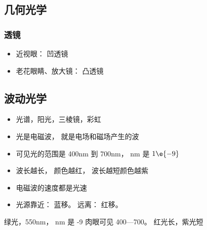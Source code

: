 
\begin{issues}
\issueDraft
\end{issues}

\subsection{几何光学}
\subsubsection{透镜}
\begin{itemize}
\item 近视眼： 凹透镜
\item 老花眼睛、放大镜： 凸透镜
\end{itemize}

\subsection{波动光学}
\begin{itemize}
\item 光谱，阳光，三棱镜，彩虹
\item 光是电磁波， 就是电场和磁场产生的波
\item 可见光的范围是 400nm 到 700nm， nm 是 $1\e{-9}$
\item 波长越长， 颜色越红， 波长越短颜色越紫
\item 电磁波的速度都是光速
\item 光源靠近： 蓝移。 远离： 红移。
\end{itemize}



绿光，550nm， nm 是 -9
肉眼可见 400—700。 红光长，紫光短